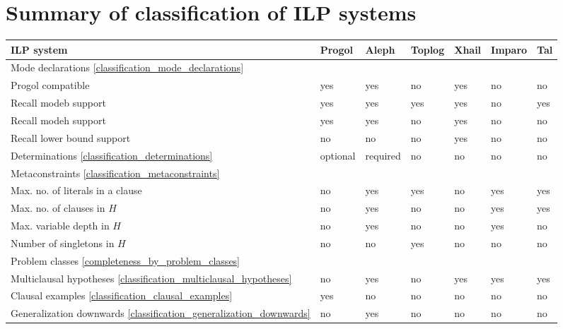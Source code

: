 \section{Summary of classification of ILP systems}\label{classification_summary}
\begin{center}
 \begin{tabular}{| l | l | l | l | l | l | l |}
    \hline
    ILP system & Progol & Aleph & Toplog & Xhail & Imparo & Tal \\ \hline
    \hline
    \multicolumn{7}{|l|}{Mode declarations \ref{classification_mode_declarations}} \\ \hline
    Progol compatible & yes & yes & no &  yes & no & no \\ \hline
    Recall modeb support & yes & yes & yes & yes & no & yes \\ \hline
    Recall modeh support & yes & yes & no & yes & no & no \\ \hline
    Recall lower bound support & no & no & no & yes & no & no \\ \hline
    \hline
    Determinations \ref{classification_determinations} & optional & required & no & no & no & no \\ \hline
    \hline
    \multicolumn{7}{|l|}{Metaconstraints \ref{classification_metaconstraints}} \\ \hline
    Max. no. of literals in a clause & no & yes & yes & no & yes & yes\\ \hline
    Max. no. of clauses in $H$ & no & yes & no & no & yes & yes\\ \hline
    Max. variable depth in $H$ & no & yes & no & no & yes & no\\ \hline
    Number of singletons in $H$ & no & no & yes & no & no & no\\ \hline    
    \hline
    
    \multicolumn{7}{|l|}{Problem classes \ref{completeness_by_problem_classes}} \\ \hline
    Multiclausal hypotheses \ref{classification_multiclausal_hypotheses}& no & yes & no & 
    yes & yes & yes \\ \hline
    
        \hline
    Clausal examples \ref{classification_clausal_examples}& yes & no & no & 
    no & no & no \\ \hline        
  	
  	Generalization downwards \ref{classification_generalization_downwards}
    & no & yes & no & no & no & no \\ \hline


\end{tabular}
\end{center}
